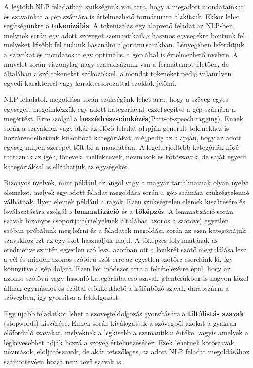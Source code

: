 A legtöbb NLP feladatban szükségünk van arra, hogy a megadott mondatainkat és szavainkat a gép számára is értelmezhető formátumra alakítsuk. Ekkor lehet segítségünkre a \textbf{tokenizálás}. A tokenizálás egy alapvető feladat az NLP-ben, melynek során egy adott szöveget szemantikailag hasznos egységekre bontunk fel, melyeket később fel tudunk használni algoritmusainkban. Lényegében lefordítjuk a szavakat és mondatokat egy optimális, a gép által is értelmezhető nyelvre. A művelet során viszonylag nagy szabadságunk van a formátumot illetően, de általában a szó tokeneket szóközökkel, a mondat tokeneket pedig valamilyen egyedi karakterrel vagy karaktersorozattal szokták jelölni.

NLP feladatok megoldása során szükségünk lehet arra, hogy a szöveg egyes egységeit megcímkézzük egy adott kategóriával, ezzel segítve a gép számára a megértést. Erre szolgál a \textbf{beszédrész-címkézés}(Part-of-speech tagging). Ennek során a szavakhoz vagy akár az előző feladat alapján generált tokenekhez is hozzárendelhetünk különböző kategóriákat, mégpedig az alapján, hogy az adott egység milyen szerepet tölt be a mondatban. A legelterjedtebb kategóriák közé tartoznak az igék, főnevek, melléknevek, névmások és kötőszavak, de saját egyedi kategóriákkal is elláthatjuk az egységeket.

Bizonyos nyelvek, mint például az angol vagy a magyar tartalmaznak olyan nyelvi elemeket, melyek egy adott feladat megoldása során a gép számára szükségtelenné válhatnak. Ilyen elemek például a ragok. Ezen szükségtelen elemek kiszűrésére és leválasztására szolgál a \textbf{lemmatizáció} és a \textbf{tőképzés}. A lemmatizáció során szavak bizonyos csoportjait(melyeknek általában azonos a szótöve) egyetlen szóban próbálunk meg leírni és a feladatok megoldása során az ezen kategóriájuk szavakhoz ezt az egy szót használjuk majd. A tőképzés folyamatának az eredménye szintén egyetlen szó lesz, azonban ott a konkrét szótő megtalálása lesz a cél és minden azonos szótövű szót erre az egyetlen szótőre cserélünk ki, így könnyítve a gép dolgát. Ezen két módszer arra a feltételezésre épül, hogy az azonos szótövű vagy hasonló kategóriába eső szavak jelentésükben is nagyon közel állnak egymáshoz és ezáltal csökkenthető a különböző szavak darabszáma a szövegben, így gyorsítva a feldolgozást.

Egy újabb feladatkör lehet a szövegfeldolgozás gyorsítására a \textbf{tiltólistás szavak} \\
(stopwords) kiszűrése. Ennek során kiválogatjuk a szövegből azokat a gyakran előforduló szavakat, melyeknek a legkisebb a szemantikai értéke, vagyis amelyek a legkevesebbet adják hozzá a szöveg értelmezéséhez. Ezek lehetnek kötőszavak, névmások, elöljárószavak, de akár tetszőleges, az adott NLP feladat megoldásához számottevően hozzá nem tevő szavak is.

